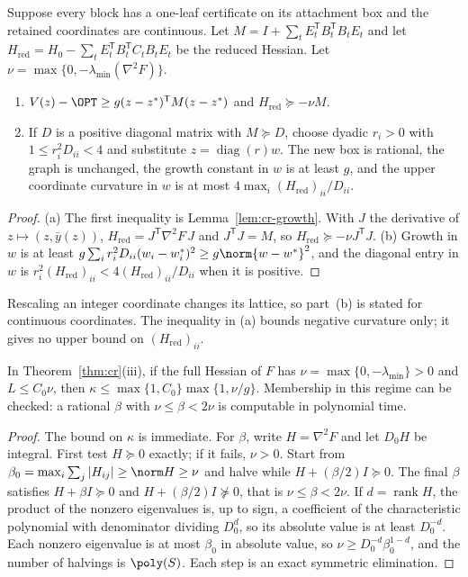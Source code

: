\begin{corollary}\label{cor:cr-affine}
Suppose every block has a one-leaf certificate on its attachment box and the
retained coordinates are continuous. Let
$M=I+\sum_tE_t^{\mathsf T}B_t^{\mathsf T}B_tE_t$ and let
$H_{\mathrm{red}}=H_0-\sum_tE_t^{\mathsf T}B_t^{\mathsf T}C_tB_tE_t$ be the reduced
Hessian. Let $\nu=\max\{0,-\lambda_{\min}(\nabla^2F)\}$.
\begin{enumerate}
\item[(a)] $V(z)-\OPT\ge g(z-z^*)^{\mathsf T}M(z-z^*)$ and
$H_{\mathrm{red}}\succeq-\nu M$.
\item[(b)] If $D$ is a positive diagonal matrix with $M\succeq D$, choose dyadic
$r_i>0$ with $1\le r_i^2D_{ii}<4$ and substitute $z=\operatorname{diag}(r)w$.
The new box is rational, the graph is unchanged, the growth constant in $w$ is
at least $g$, and the upper coordinate curvature in $w$ is at most
$4\max_i(H_{\mathrm{red}})_{ii}/D_{ii}$.
\end{enumerate}
\end{corollary}

\begin{proof}
(a) The first inequality is Lemma~\ref{lem:cr-growth}. With $J$ the derivative
of $z\mapsto(z,\bar y(z))$, $H_{\mathrm{red}}=J^{\mathsf T}\nabla^2F\,J$ and
$J^{\mathsf T}J=M$, so $H_{\mathrm{red}}\succeq-\nu J^{\mathsf T}J$. (b) Growth in
$w$ is at least
$g\sum_ir_i^2D_{ii}(w_i-w_i^*)^2\ge g\norm{w-w^*}^2$, and the diagonal entry
in $w$ is $r_i^2(H_{\mathrm{red}})_{ii}<4(H_{\mathrm{red}})_{ii}/D_{ii}$ when it is
positive.
\end{proof}

Rescaling an integer coordinate changes its lattice, so part~(b) is stated for
continuous coordinates. The inequality in (a) bounds negative curvature only;
it gives no upper bound on $(H_{\mathrm{red}})_{ii}$.

\begin{corollary}\label{cor:cr-nu}
In Theorem~\ref{thm:cr}(iii), if the full Hessian of $F$ has
$\nu=\max\{0,-\lambda_{\min}\}>0$ and $L\le C_0\nu$, then
$\kappa\le\max\{1,C_0\}\max\{1,\nu/g\}$. Membership in this regime can be
checked: a rational $\beta$ with $\nu\le\beta<2\nu$ is computable in polynomial
time.
\end{corollary}

\begin{proof}
The bound on $\kappa$ is immediate. For $\beta$, write $H=\nabla^2F$ and let
$D_0H$ be integral. First test $H\succeq0$ exactly; if it fails, $\nu>0$.
Start from $\beta_0=\max_i\sum_j|H_{ij}|\ge\norm H\ge\nu$ and halve while
$H+(\beta/2)I\succeq0$. The final $\beta$ satisfies $H+\beta I\succeq0$ and
$H+(\beta/2)I\not\succeq0$, that is $\nu\le\beta<2\nu$. If $d=\operatorname{rank}H$,
the product of the nonzero eigenvalues is, up to sign, a coefficient of the
characteristic polynomial with denominator dividing $D_0^d$, so its absolute
value is at least $D_0^{-d}$. Each nonzero eigenvalue is at most $\beta_0$ in
absolute value, so $\nu\ge D_0^{-d}\beta_0^{1-d}$, and the number of halvings
is $\poly(S)$. Each step is an exact symmetric elimination.
\end{proof}

